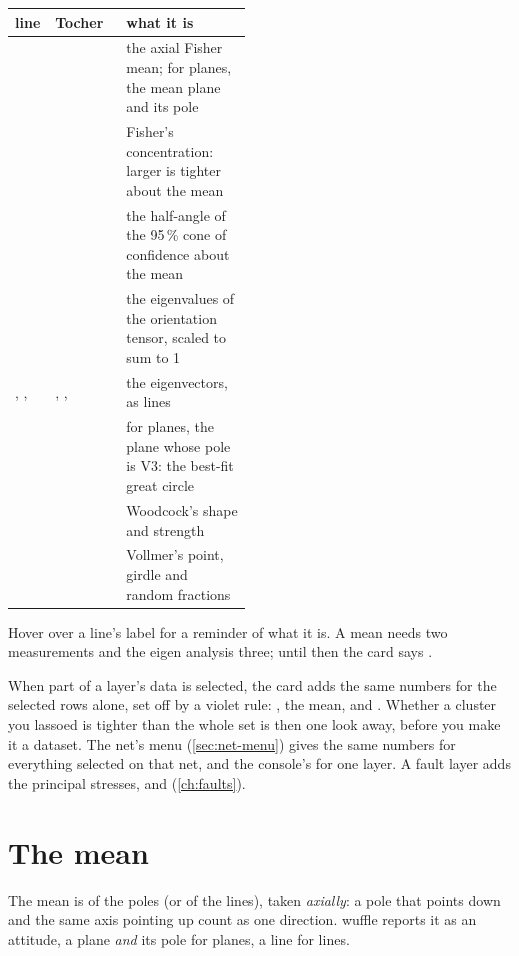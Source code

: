 \begin{center}\small
\begin{tabularx}{\linewidth}{@{}>{\raggedright}p{0.17\linewidth}>{\raggedright}p{0.3\linewidth}L@{}}\toprule
\sffamily\bfseries line & \sffamily\bfseries Tocher & \sffamily\bfseries what it is \\\midrule
{} &  & the axial Fisher mean; for planes, the mean plane and its pole \\
 &  & Fisher's concentration: larger is tighter about the mean \\
 &  & the half-angle of the 95\,\% cone of confidence about the mean \\
 &  & the eigenvalues of the orientation tensor, scaled to sum to 1 \\
, ,  & , ,  & the eigenvectors, as lines \\
&  & for planes, the plane whose pole is V3: the best-fit great circle \\
 &  & Woodcock's shape and strength \\
 &  & Vollmer's point, girdle and random fractions \\
\bottomrule\end{tabularx}
\end{center}

Hover over a line's label for a reminder of what it is. A mean needs two measurements and the eigen
analysis three; until then the card says .

When part of a layer's data is selected, the card adds the same numbers for the selected rows alone, set
off by a violet rule: , the mean,  and . Whether a cluster you
lassoed is tighter than the whole set is then one look away, before you make it a dataset. The net's menu
(\cref{sec:net-menu}) gives the same numbers for everything selected on that net, and the console's
 for one layer. A fault layer adds the principal stresses,
 and  (\cref{ch:faults}).

\section{The mean}\label{sec:stats-mean}

The mean is  \parencite{fisher1953} of the poles (or of the lines), taken \emph{axially}: a pole that
points down and the same axis pointing up count as one direction. wuffle reports it as an attitude, a plane
\emph{and} its pole for planes, a line for lines.

